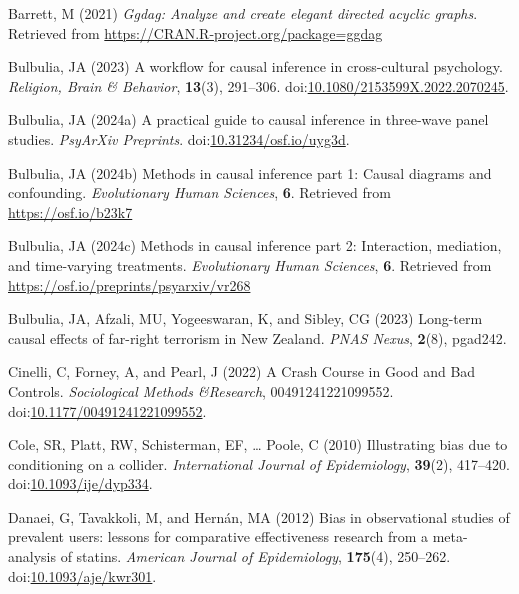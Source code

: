 \documentclass[
  singlecolumn]{article}
\newlength{\cslhangindent}
\newenvironment{CSLReferences}[2] %
 {\begin{list}{}{%
  \setlength{\itemindent}{0pt}
  \setlength{\leftmargin}{0pt}
  \setlength{\parsep}{0pt}
  \ifodd #1
   \setlength{\leftmargin}{\cslhangindent}
   \setlength{\itemindent}{-1\cslhangindent}
  \fi
  \setlength{\itemsep}{#2\baselineskip}}}
 {\end{list}}
\begin{document}
\label{refs}
\begin{CSLReferences}{1}{0}
Barrett, M (2021) \emph{Ggdag: Analyze and create elegant directed
acyclic graphs}. Retrieved from
\url{https://CRAN.R-project.org/package=ggdag}

Bulbulia, JA (2023) A workflow for causal inference in cross-cultural
psychology. \emph{Religion, Brain \& Behavior}, \textbf{13}(3),
291--306.
doi:\href{https://doi.org/10.1080/2153599X.2022.2070245}{10.1080/2153599X.2022.2070245}.

Bulbulia, JA (2024a) A practical guide to causal inference in three-wave
panel studies. \emph{PsyArXiv Preprints}.
doi:\href{https://doi.org/10.31234/osf.io/uyg3d}{10.31234/osf.io/uyg3d}.

Bulbulia, JA (2024b) Methods in causal inference part 1: Causal diagrams
and confounding. \emph{Evolutionary Human Sciences}, \textbf{6}.
Retrieved from \url{https://osf.io/b23k7}

Bulbulia, JA (2024c) Methods in causal inference part 2: Interaction,
mediation, and time-varying treatments. \emph{Evolutionary Human
Sciences}, \textbf{6}. Retrieved from
\url{https://osf.io/preprints/psyarxiv/vr268}

Bulbulia, JA, Afzali, MU, Yogeeswaran, K, and Sibley, CG (2023)
Long-term causal effects of far-right terrorism in {N}ew {Z}ealand.
\emph{PNAS Nexus}, \textbf{2}(8), pgad242.

Cinelli, C, Forney, A, and Pearl, J (2022) A Crash Course in Good and
Bad Controls. \emph{Sociological Methods \&Research}, 00491241221099552.
doi:\href{https://doi.org/10.1177/00491241221099552}{10.1177/00491241221099552}.

Cole, SR, Platt, RW, Schisterman, EF, \ldots{} Poole, C (2010)
Illustrating bias due to conditioning on a collider. \emph{International
Journal of Epidemiology}, \textbf{39}(2), 417--420.
doi:\href{https://doi.org/10.1093/ije/dyp334}{10.1093/ije/dyp334}.

Danaei, G, Tavakkoli, M, and Hernán, MA (2012) Bias in observational
studies of prevalent users: lessons for comparative effectiveness
research from a meta-analysis of statins. \emph{American Journal of
Epidemiology}, \textbf{175}(4), 250--262.
doi:\href{https://doi.org/10.1093/aje/kwr301}{10.1093/aje/kwr301}.


\end{CSLReferences}
\end{document}
